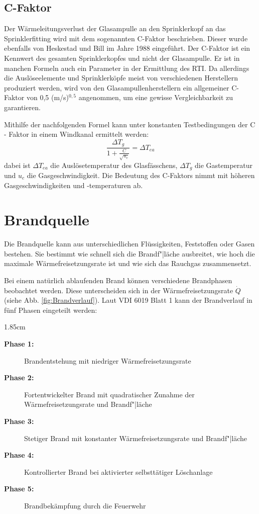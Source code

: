 \subsection{C-Faktor}
\label{sec:CFaktor}
Der Wärmeleitungsverlust der Glasampulle an den Sprinklerkopf \bzw an das Sprinklerfitting wird mit dem sogenannten C-Faktor beschrieben. Dieser wurde ebenfalls von Heskestad und Bill im Jahre 1988 \cite{Heskestad1988} eingeführt. Der C-Faktor ist ein Kennwert des gesamten Sprinklerkopfes und nicht der Glasampulle. Er ist in manchen Formeln auch ein Parameter in der Ermittlung des RTI. Da allerdings die Auslöseelemente und Sprinklerköpfe meist von verschiedenen Herstellern produziert werden, wird von den Glasampullenherstellern ein allgemeiner C-Faktor von 0,5 (m/s)$^{0,5}$ angenommen, um eine gewisse Vergleichbarkeit zu garantieren.


Mithilfe der nachfolgenden Formel kann unter konstanten Testbedingungen der C - Faktor in einem Windkanal ermittelt werden:
\begin{equation}
\label{eq:C-Faktor}
    \frac{\Delta T_g}{1+\frac{C}{\sqrt{u_c}}}=\Delta T_{ea}
\end{equation}
dabei ist $\Delta T_{ea}$ die Auslösetemperatur des Glasfässchens, $\Delta T_g$ die Gastemperatur und $u_c$ die Gasgeschwindigkeit. Die Bedeutung des C-Faktors nimmt mit höheren Gasgeschwindigkeiten und -temperaturen \cite{Heskestad1988} ab.





\section{Brandquelle}
\label{sec:Brandquelle}
Die Brandquelle kann aus unterschiedlichen Flüssigkeiten, Feststoffen oder Gasen bestehen. Sie bestimmt wie schnell sich die Brandf"|läche ausbreitet, wie hoch die maximale Wärmefreisetzungsrate ist und wie sich das Rauchgas zusammensetzt.

Bei einem natürlich ablaufenden Brand können verschiedene Brandphasen beobachtet werden. Diese unterscheiden sich in der Wärmefreisetzungsrate $\Dot{Q}$ (siehe Abb. \ref{fig:Brandverlauf}).
Laut VDI 6019 Blatt 1 \cite{VDI6019B1} kann der Brandverlauf in fünf Phasen eingeteilt werden:
\newpage
\begin{setlength}{\leftmargini}{1.85cm}
\begin{description}
    \item[\textbf{Phase 1:}] Brandentstehung mit niedriger Wärmefreisetzungsrate
    \item[\textbf{Phase 2:}] Fortentwickelter Brand mit quadratischer Zunahme der Wärmefreisetzungsrate und Brandf"|läche
    \item[\textbf{Phase 3:}] Stetiger Brand mit konstanter Wärmefreisetzungsrate und Brandf"|läche
    \item[\textbf{Phase 4:}] Kontrollierter Brand bei aktivierter selbsttätiger Löschanlage
    \item[\textbf{Phase 5:}] Brandbekämpfung durch die Feuerwehr
\end{description}
\end{setlength}

